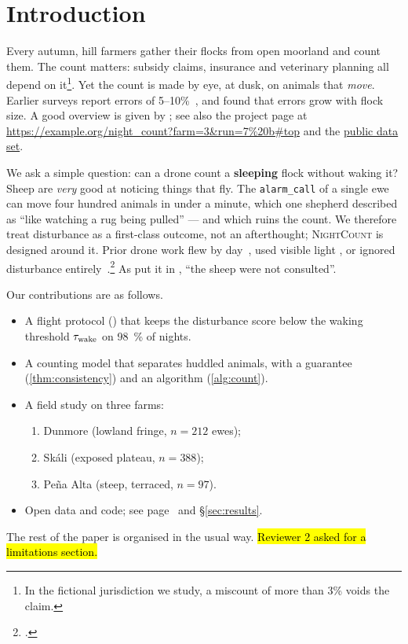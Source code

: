 \section{Introduction}
\label{sec:intro}

Every autumn, hill farmers gather their flocks from open moorland and count them. The count matters: subsidy claims, insurance and veterinary planning all depend on it\footnote{In the fictional jurisdiction we study, a miscount of more than 3\% voids the claim.}. Yet the count is made by eye, at dusk, on animals that \emph{move}. Earlier surveys report errors of 5--10\%~\citep{brannigan2017dusk}, and \citet{oyelaran2019flock} found that errors grow with flock size. A good overview is given by \textcite[ch.~2]{halloran2021pastoral}; see also the project page at \url{https://example.org/night_count?farm=3&run=7%20b#top} and the \href{https://example.org/data}{public data set}.

\noindent We ask a simple question: can a drone count a \textbf{sleeping} flock without waking it? Sheep are \textit{very} good at noticing things that fly. The \texttt{alarm\_call} of a single ewe can move four hundred animals in under a minute, which one shepherd described as ``like watching a rug being pulled'' --- and which ruins the count. We therefore treat disturbance as a first-class outcome, not an afterthought; \textsc{NightCount} is designed around it. Prior drone work flew by day~\citep[see][p.~14]{vasquez2020aerial}, used visible light \parencite{vasquez2020aerial,brannigan2017dusk}, or ignored disturbance entirely~\autocite{tamm2018thermal}.\footcite{tamm2018thermal} As \citeauthor{tamm2018thermal} put it in \citeyear{tamm2018thermal}, ``the sheep were not consulted''.

Our contributions are as follows.
\begin{itemize}
  \item A flight protocol () that keeps the disturbance score below the waking threshold $\tau_{\mathrm{wake}}$ on \SI{98}{\percent} of nights.
  \item A counting model that separates huddled animals, with a guarantee (\cref{thm:consistency}) and an algorithm (\autoref{alg:count}).
  \item A field study on three farms:
  \begin{enumerate}
    \item Dunmore (lowland fringe, $n = 212$ ewes);
    \item Sk\'ali (exposed plateau, $n = 388$);
    \item Pe\~na Alta (steep, terraced, $n = 97$).
  \end{enumerate}
  \item Open data and code; see page~\pageref{sec:results} and \S\ref{sec:results}.
\end{itemize}
The rest of the paper is organised in the usual way.  \hl{Reviewer 2 asked for a limitations section.} 

